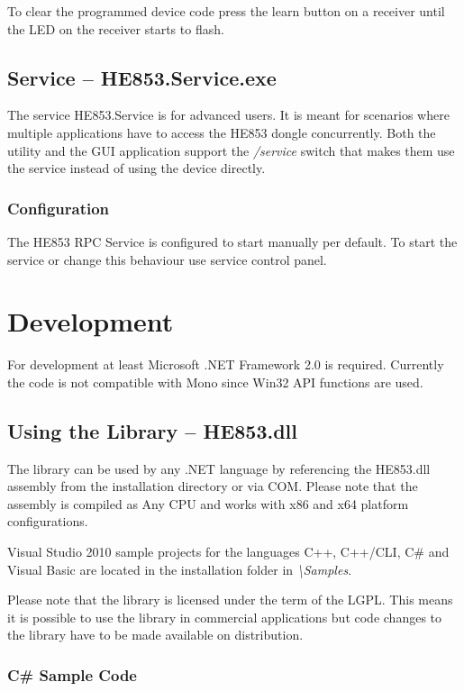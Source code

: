 \documentclass[
a4paper,
oneside,
halfparskip*,
normalheadings,
]
{scrbook}
\begin{document}
To clear the programmed device code press the learn button on a receiver until the LED
on the receiver starts to flash.

\section{Service -- HE853.Service.exe}

The service HE853.Service is for advanced users. It is meant for scenarios where multiple
applications have to access the HE853 dongle concurrently. Both the utility and the
GUI application support the \textit{/service} switch that makes them use the service
instead of using the device directly.

\subsection{Configuration}

The HE853 RPC Service is configured to start manually per default. To start the service
or change this behaviour use service control panel. 




\chapter{Development}

For development at least Microsoft .NET Framework 2.0 is required. Currently the code
is not compatible with Mono since Win32 API functions are used.

\section{Using the Library -- HE853.dll}

The library can be used by any .NET language by referencing the HE853.dll assembly from the
installation directory or via COM. Please note that the assembly is compiled as Any CPU
and works with x86 and x64 platform configurations.

Visual Studio 2010 sample projects for the languages C++, C++/CLI, C\# and Visual Basic
are located in the installation folder in \textit{\textbackslash Samples}.

Please note that the library is licensed under the term of the LGPL. This means it is
possible to use the library in commercial applications but code changes to the library
have to be made available on distribution.

\subsection{C\# Sample Code}
\end{document}
